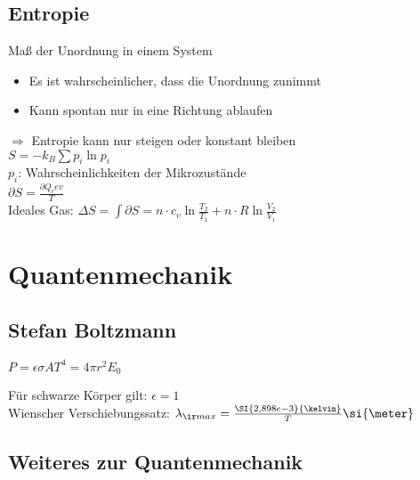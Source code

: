 \documentclass[german, 8pt]{latex4ei/latex4ei_sheet}
\begin{document}
\subsection{Entropie}
Maß der Unordnung in einem System
\begin{itemize}
	\item Es ist wahrscheinlicher, dass die Unordnung zunimmt
	\item Kann spontan nur in eine Richtung ablaufen
\end{itemize}
$\Rightarrow$ Entropie kann nur steigen oder konstant bleiben\\
$S=-k_B\sum p_i \ln p_i$ \\ 
$p_i$: Wahrscheinlichkeiten der Mikrozustände\\
$\partial S = \frac{\partial Q_rev}{T}$\\
Ideales Gas: $\Delta S= \int \partial S = n \cdot c_v \ln \frac{T_2}{T_1}+n\cdot R \ln \frac{V_2}{V_1}$



\section{Quantenmechanik}
\subsection{Stefan Boltzmann}
\begin{emphbox}
$P=\epsilon \sigma A T^4 = 4 \pi r^2 E_0$
\end{emphbox}
Für schwarze Körper gilt: $\epsilon = 1$\\
Wienscher Verschiebungssatz: $\lambda_{\ir max}=\frac{\SI{2,898e-3}{\kelvin}}{T} \si{\meter}$
\subsection{Weiteres zur Quantenmechanik}

\end{document}
